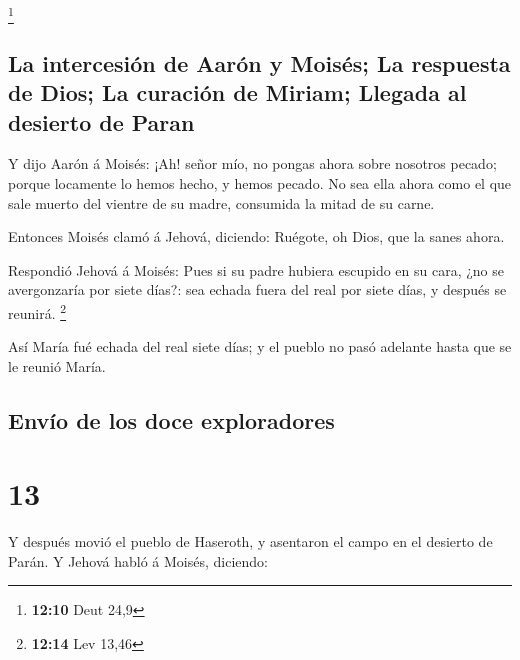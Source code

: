 \footnote{\textbf{12:10} Deut 24,9}

\hypertarget{la-intercesiuxf3n-de-aaruxf3n-y-moisuxe9s-la-respuesta-de-dios-la-curaciuxf3n-de-miriam-llegada-al-desierto-de-paran}{%
\subsection{La intercesión de Aarón y Moisés; La respuesta de Dios; La
curación de Miriam; Llegada al desierto de
Paran}\label{la-intercesiuxf3n-de-aaruxf3n-y-moisuxe9s-la-respuesta-de-dios-la-curaciuxf3n-de-miriam-llegada-al-desierto-de-paran}}

 Y dijo Aarón á Moisés: ¡Ah! señor mío, no pongas ahora
sobre nosotros pecado; porque locamente lo hemos hecho, y hemos pecado.
 No sea ella ahora como el que sale muerto del vientre de
su madre, consumida la mitad de su carne.

 Entonces Moisés clamó á Jehová, diciendo: Ruégote, oh
Dios, que la sanes ahora.

 Respondió Jehová á Moisés: Pues si su padre hubiera
escupido en su cara, ¿no se avergonzaría por siete días?: sea echada
fuera del real por siete días, y después se reunirá. \footnote{\textbf{12:14}
  Lev 13,46}

 Así María fué echada del real siete días; y el pueblo no
pasó adelante hasta que se le reunió María. 

\hypertarget{envuxedo-de-los-doce-exploradores}{%
\subsection{Envío de los doce
exploradores}\label{envuxedo-de-los-doce-exploradores}}

\hypertarget{section-12}{%
\section{13}\label{section-12}}

 Y después movió el pueblo de Haseroth, y asentaron el
campo en el desierto de Parán.  Y Jehová habló á Moisés,
diciendo:

